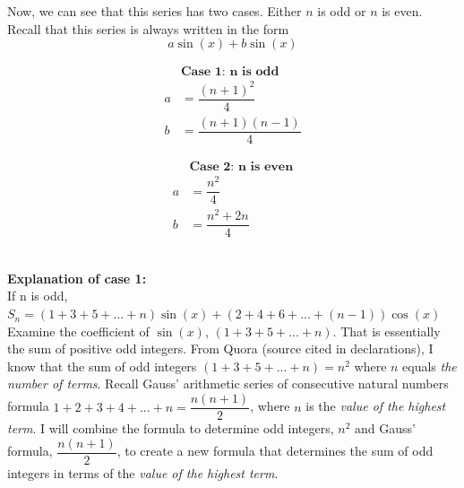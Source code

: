 \documentclass[12pt]{book}
\begin{document}
\begin{enumerate}
\newpage  %
Now, we can see that this series has two cases. Either $n$ is odd or $n$ is even. Recall that this series is always written in the form $$a\sin(x) + b\sin(x)$$
\begingroup
\addtolength{\jot}{0.8em}
\begin{minipage}{.5\textwidth}
    \begin{align*}
    &\textbf{Case 1: $\mathbf{n}$ is odd}\\
        a &= \dfrac{(n+1)^2}{4} \\
        b &= \dfrac{(n+1)(n-1)}{4}
    \end{align*}      
    \end{minipage}
    \begin{minipage}{.5\textwidth}
    \begin{align*}
    &\textbf{Case 2: $\mathbf{n}$ is even}\\
        a &= \dfrac{n^2}{4} \\
        b &= \dfrac{n^2 +2n}{4}
    \end{align*}
\end{minipage}
\endgroup\\

\textbf{Explanation of case 1:}\\
If n is odd,\\
$S_n = (1+3+5+...+n)\sin(x) + (2+4+6+...+(n-1))\cos(x)$\\

Examine the coefficient of $\sin(x)$, $(1+3+5+...+n)$. That is essentially the sum of positive odd integers. From Quora (source cited in declarations), I know that the sum of odd integers $(1+3+5+...+n) = n^2$ where $n$ equals \textit{the number of terms}. Recall Gauss' arithmetic series of consecutive natural numbers formula $1+2+3+4+...+n = \dfrac{n(n+1)}{2}$, where $n$ is the \textit{value of the highest term}. I will combine the formula to determine odd integers, $n^2$ and Gauss' formula, $\dfrac{n(n+1)}{2}$, to create a new formula that determines the sum of odd integers in terms of the \textit{value of the highest term}.\\


\end{enumerate}
\end{document}
